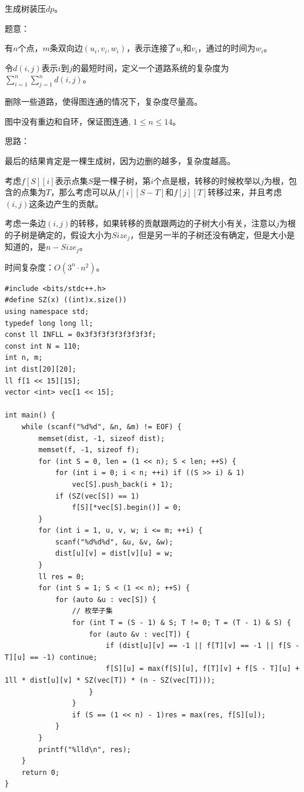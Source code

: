 生成树装压$dp$。\par

题意：\par
有$n$个点，$m$条双向边$(u_i, v_i, w_i)$，表示连接了$u_i$和$v_i$，通过的时间为$w_i$。\par
令$d(i, j)$表示$i$到$j$的最短时间，定义一个道路系统的复杂度为$\sum\limits_{i = 1}^n \sum\limits_{j = 1}^n d(i, j)$。\par
删除一些道路，使得图连通的情况下，复杂度尽量高。\par
图中没有重边和自环，保证图连通, $1 \leq n \leq 14$。\par

思路：\par
最后的结果肯定是一棵生成树，因为边删的越多，复杂度越高。\par
考虑$f[S][i]$表示点集$S$是一棵子树，第$i$个点是根，转移的时候枚举以$j$为根，包含的点集为$T$，那么考虑可以从$f[i][S - T]$和$f[j][T]$转移过来，并且考虑$(i, j)$这条边产生的贡献。\par
考虑一条边$(i, j)$的转移，如果转移的贡献跟两边的子树大小有关，注意以$j$为根的子树是确定的，假设大小为$Size_j$，但是另一半的子树还没有确定，但是大小是知道的，是$n - Size_j$。\par

时间复杂度：$O(3^n \cdot n^2)$。\par

\begin{lstlisting}
#include <bits/stdc++.h>
#define SZ(x) ((int)x.size())
using namespace std;
typedef long long ll;
const ll INFLL = 0x3f3f3f3f3f3f3f3f;
const int N = 110;
int n, m;
int dist[20][20];
ll f[1 << 15][15];
vector <int> vec[1 << 15];

int main() {
	while (scanf("%d%d", &n, &m) != EOF) {
		memset(dist, -1, sizeof dist); 
		memset(f, -1, sizeof f);
	    for (int S = 0, len = (1 << n); S < len; ++S) {
			for (int i = 0; i < n; ++i) if ((S >> i) & 1)
				vec[S].push_back(i + 1); 
			if (SZ(vec[S]) == 1)
				f[S][*vec[S].begin()] = 0;
		}	
		for (int i = 1, u, v, w; i <= m; ++i) {
			scanf("%d%d%d", &u, &v, &w);
			dist[u][v] = dist[v][u] = w; 
		}
		ll res = 0;  
		for (int S = 1; S < (1 << n); ++S) { 
			for (auto &u : vec[S]) {
				// 枚举子集  
				for (int T = (S - 1) & S; T != 0; T = (T - 1) & S) {
					for (auto &v : vec[T]) {
						if (dist[u][v] == -1 || f[T][v] == -1 || f[S - T][u] == -1) continue;   
						f[S][u] = max(f[S][u], f[T][v] + f[S - T][u] + 1ll * dist[u][v] * SZ(vec[T]) * (n - SZ(vec[T])));  
					}
				}
				if (S == (1 << n) - 1)res = max(res, f[S][u]);
			}
		}
		printf("%lld\n", res);
	}
	return 0;
}
\end{lstlisting}

